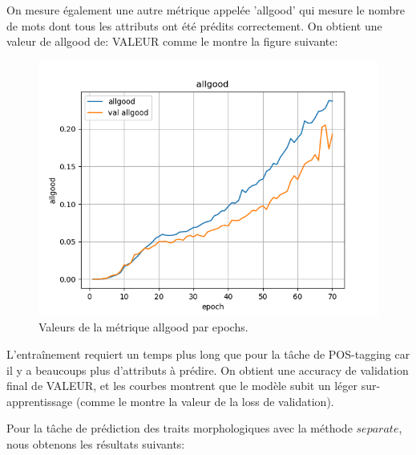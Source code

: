 \documentclass[a4paper]{article}
\begin{document}
On mesure également une autre métrique appelée 'allgood' qui mesure le nombre de mots dont tous les attributs 
ont été prédits correctement. On obtient une valeur de allgood de: VALEUR comme le
montre la figure suivante:

\begin{figure}[H]
    \centering
    \includegraphics[width=0.45\linewidth]{../logs/get_morphy_sep0_French_3/allgood.png}
    \caption{Valeurs de la métrique allgood par epochs.}
\end{figure}


L'entraînement requiert un temps plus long que pour la tâche de POS-tagging car il y a beaucoups plus 
d'attributs à prédire.
On obtient une accuracy de validation final de VALEUR, et les courbes montrent que le modèle subit un 
léger sur-apprentissage (comme le montre la valeur de la loss de validation).

Pour la tâche de prédiction des traits morphologiques avec la méthode $separate$, nous obtenons les 
résultats suivants: %
\end{document}
